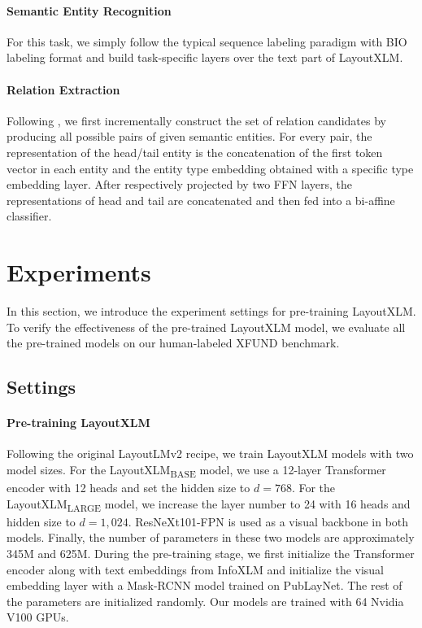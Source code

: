\documentclass[11pt]{article}
\newcommand{\task}{\textsc{XFUND}\xspace}
\begin{document}
\paragraph{Semantic Entity Recognition}
For this task, we simply follow the typical sequence labeling paradigm with BIO labeling format and build task-specific layers over the text part of LayoutXLM. 

\paragraph{Relation Extraction}
Following \citet{DBLP:journals/eswa/BekoulisDDD18a} , we first incrementally construct the set of relation candidates by producing all possible pairs of given semantic entities. For every pair, the representation of the head/tail entity is the concatenation of the first token vector in each entity and the entity type embedding obtained with a specific type embedding layer. After respectively projected by two FFN layers, the representations of head and tail are concatenated and then fed into a bi-affine classifier.


\section{Experiments}
In this section, we introduce the experiment settings for pre-training LayoutXLM. To verify the effectiveness of the pre-trained LayoutXLM model, we evaluate all the pre-trained models on our human-labeled \task benchmark.

\subsection{Settings}
\paragraph{Pre-training LayoutXLM}
Following the original LayoutLMv2 recipe, we train LayoutXLM models with two model sizes. For the LayoutXLM\textsubscript{BASE} model, we use a 12-layer Transformer encoder with 12 heads and set the hidden size to $d=768$. For the LayoutXLM\textsubscript{LARGE} model, we increase the layer number to 24 with 16 heads and hidden size to $d=1,024$. ResNeXt101-FPN is used as a visual backbone in both models. Finally, the number of parameters in these two models are approximately 345M and 625M.
During the pre-training stage, we first initialize the Transformer encoder along with text embeddings from InfoXLM and initialize the visual embedding layer with a Mask-RCNN model trained on PubLayNet. The rest of the parameters are initialized randomly. Our models are trained with 64 Nvidia V100 GPUs.
\end{document}
